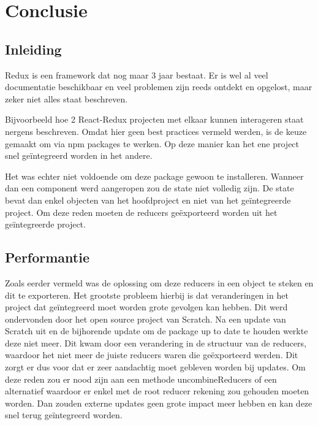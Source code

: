 
\chapter{Conclusie}
\label{ch:conclusie}


\section{Inleiding}
Redux is een framework dat nog maar 3 jaar bestaat. Er is wel al veel documentatie beschikbaar en veel problemen zijn reeds ontdekt en opgelost, maar zeker niet alles staat beschreven. 

Bijvoorbeeld hoe 2 React-Redux projecten met elkaar kunnen interageren staat nergens beschreven. Omdat hier geen best practices vermeld werden, is de keuze gemaakt om via npm packages te werken. Op deze manier kan het ene project snel geïntegreerd worden in het andere. 

Het was echter niet voldoende om deze package gewoon te installeren. Wanneer dan een component werd aangeropen zou de state niet volledig zijn. De state bevat dan enkel objecten van het hoofdproject en niet van het geïntegreerde project. Om deze reden moeten de reducers geëxporteerd worden uit het geïntegreerde project. 

\section{Performantie}
Zoals eerder vermeld was de oplossing om deze reducers in een object te steken en dit te exporteren. Het grootste probleem hierbij is dat veranderingen in het project dat geïntegreerd moet worden grote gevolgen kan hebben. Dit werd ondervonden door het open source project van Scratch. Na een update van Scratch uit en de bijhorende update om de package up to date te houden werkte deze niet meer. Dit kwam door een verandering in de structuur van de reducers, waardoor het niet meer de juiste reducers waren die geëxporteerd werden. Dit zorgt er dus voor dat er zeer aandachtig moet gebleven worden bij updates. Om deze reden zou er nood zijn aan een methode uncombineReducers of een alternatief waardoor er enkel met de root reducer rekening zou gehouden moeten worden. Dan zouden externe updates geen grote impact meer hebben en kan deze snel terug geïntegreerd worden.

